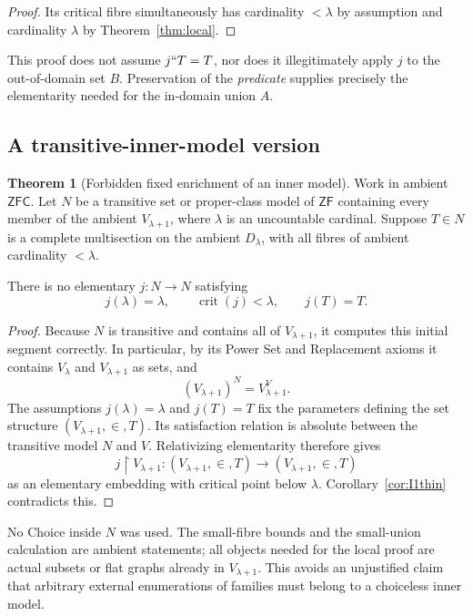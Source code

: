 \documentclass[11pt,letterpaper]{article}
\theoremstyle{definition}
\newtheorem{theorem}[definition]{Theorem}
\numberwithin{equation}{section}
\newcommand{\ZFC}{\mathsf{ZFC}}
\newcommand{\ZF}{\mathsf{ZF}}
\newcommand{\crit}{\operatorname{crit}}
\newcommand{\restr}{\mathbin{\upharpoonright}}
\begin{document}
\begin{proof}
Its critical fibre simultaneously has cardinality $<\lambda$ by assumption and cardinality $\lambda$ by Theorem~\ref{thm:local}.
\end{proof}

This proof does not assume $j``T=T$, nor does it illegitimately apply $j$ to the out-of-domain set $B$. Preservation of the \emph{predicate} supplies precisely the elementarity needed for the in-domain union $A$.

\subsection{A transitive-inner-model version}

\begin{theorem}[Forbidden fixed enrichment of an inner model]\label{thm:inner}
Work in ambient $\ZFC$. Let $N$ be a transitive set or proper-class model of $\ZF$ containing every member of the ambient $V_{\lambda+1}$, where $\lambda$ is an uncountable cardinal. Suppose $T\in N$ is a complete multisection on the ambient $D_\lambda$, with all fibres of ambient cardinality $<\lambda$.

There is no elementary $j:N\to N$ satisfying
\[
 j(\lambda)=\lambda,\qquad \crit(j)<\lambda,
 \qquad j(T)=T.
\]
\end{theorem}

\begin{proof}
Because $N$ is transitive and contains all of $V_{\lambda+1}$, it computes this initial segment correctly. In particular, by its Power Set and Replacement axioms it contains $V_\lambda$ and $V_{\lambda+1}$ as sets, and
\[
 (V_{\lambda+1})^N=V_{\lambda+1}^V.
\]
The assumptions $j(\lambda)=\lambda$ and $j(T)=T$ fix the parameters defining the set structure $(V_{\lambda+1},\in,T)$. Its satisfaction relation is absolute between the transitive model $N$ and $V$. Relativizing elementarity therefore gives
\[
 j\restr V_{\lambda+1}:
 (V_{\lambda+1},\in,T)\longrightarrow(V_{\lambda+1},\in,T)
\]
as an elementary embedding with critical point below $\lambda$. Corollary~\ref{cor:I1thin} contradicts this.
\end{proof}

No Choice inside $N$ was used. The small-fibre bounds and the small-union calculation are ambient statements; all objects needed for the local proof are actual subsets or flat graphs already in $V_{\lambda+1}$. This avoids an unjustified claim that arbitrary external enumerations of families must belong to a choiceless inner model.
\end{document}
